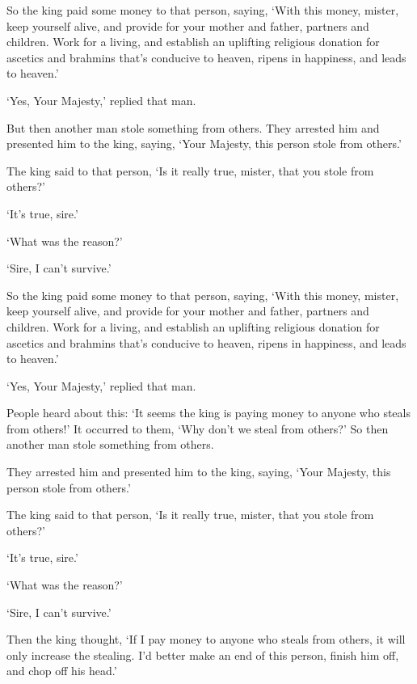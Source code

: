\documentclass[12pt,openany]{book}%
\begin{document}
So the king paid some money to that person, saying, ‘With this money, mister, keep yourself alive, and provide for your mother and father, partners and children. Work for a living, and establish an uplifting religious donation for ascetics and brahmins that’s conducive to heaven, ripens in happiness, and leads to heaven.’ 

‘Yes, Your Majesty,’ replied that man. 

But then another man stole something from others. They arrested him and presented him to the king, saying, ‘Your Majesty, this person stole from others.’ 

The king said to that person, ‘Is it really true, mister, that you stole from others?’ 

‘It’s true, sire.’ 

‘What was the reason?’ 

‘Sire, I can’t survive.’ 

So the king paid some money to that person, saying, ‘With this money, mister, keep yourself alive, and provide for your mother and father, partners and children. Work for a living, and establish an uplifting religious donation for ascetics and brahmins that’s conducive to heaven, ripens in happiness, and leads to heaven.’ 

‘Yes, Your Majesty,’ replied that man. 

People heard about this: ‘It seems the king is paying money to anyone who steals from others!’ It occurred to them, ‘Why don’t we steal from others?’ So then another man stole something from others. 

They arrested him and presented him to the king, saying, ‘Your Majesty, this person stole from others.’ 

The king said to that person, ‘Is it really true, mister, that you stole from others?’ 

‘It’s true, sire.’ 

‘What was the reason?’ 

‘Sire, I can’t survive.’ 

Then the king thought, ‘If I pay money to anyone who steals from others, it will only increase the stealing. I’d better make an end of this person, finish him off, and chop off his head.’ 
\end{document}
